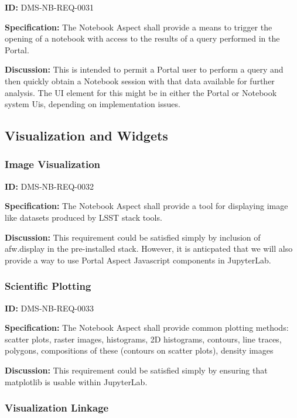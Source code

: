 \documentclass[SE,toc,lsstdraft]{lsstdoc}
\begin{document}
\label{DMS-NB-REQ-0031}
\textbf{ID:} DMS-NB-REQ-0031

\textbf{Specification:}
The Notebook Aspect shall provide a means to trigger the opening of a notebook with access to the results of a query performed in the Portal.

\textbf{Discussion:}
This is intended to permit a Portal user to perform a query and then quickly obtain a Notebook session with that data available for further analysis.  The UI element for this might be in either the Portal or Notebook system Uis, depending on implementation issues.

\subsection{Visualization and Widgets}

\subsubsection{Image Visualization}

\label{DMS-NB-REQ-0032}
\textbf{ID:} DMS-NB-REQ-0032

\textbf{Specification:}
The Notebook Aspect shall provide a tool for displaying image like datasets produced by LSST stack tools.

\textbf{Discussion:}
This requirement could be satisfied simply by inclusion of afw.display in the pre-installed stack.  However, it is anticpated that we will also provide a way to use Portal Aspect Javascript components in JupyterLab.

\subsubsection{Scientific Plotting}

\label{DMS-NB-REQ-0033}
\textbf{ID:} DMS-NB-REQ-0033

\textbf{Specification:}
The Notebook Aspect shall provide common plotting methods:
scatter plots, raster images, histograms, 2D histograms, contours, line traces, polygons, compositions of these (contours on scatter plots), density images

\textbf{Discussion:}
This requirement could be satisfied simply by ensuring that matplotlib is usable within JupyterLab.

\subsubsection{Visualization Linkage}
\end{document}
